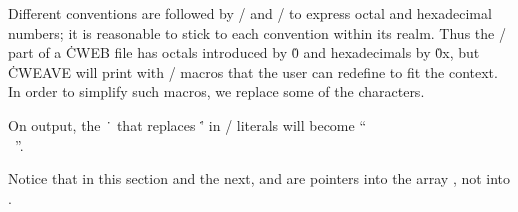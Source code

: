 Different conventions are followed by \TEX/ and \CEE/ to express octal
and hexadecimal numbers; it is reasonable to stick to each convention
within its realm.  Thus the \CEE/ part of a \.{CWEB} file has octals
introduced by \.0 and hexadecimals by \.{0x}, but \.{CWEAVE} will print
with \TEX/ macros that the user can redefine to fit the context.
In order to simplify such macros, we replace some of the characters.

On output, the \.{\ } that replaces \.{'} in \CPLUSPLUS/ literals will become
``\.{\\\ }''.

Notice that in this section and the next,  and 
are pointers into the array , not into .

